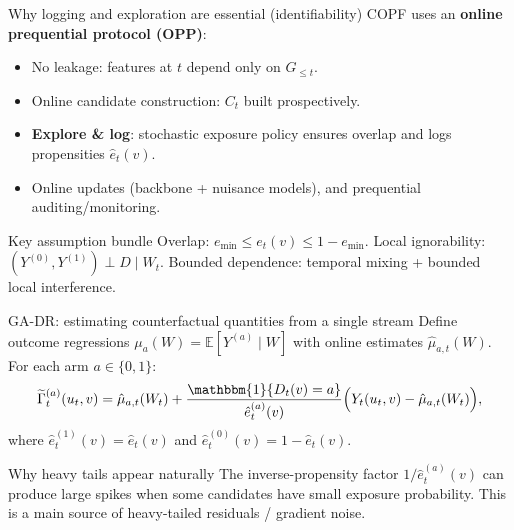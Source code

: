 \documentclass[aspectratio=169,11pt]{beamer}
\newcommand{\1}{\mathbbm{1}}
\newcommand{\E}{\mathbb{E}}
\begin{document}
\begin{frame}{Why logging and exploration are essential (identifiability)}
\small
COPF uses an \textbf{online prequential protocol (OPP)}:
\begin{itemize}
  \item No leakage: features at $t$ depend only on $G_{\le t}$.
  \item Online candidate construction: $C_t$ built prospectively.
  \item \textbf{Explore \& log}: stochastic exposure policy ensures overlap and logs propensities $\hat e_t(v)$.
  \item Online updates (backbone + nuisance models), and prequential auditing/monitoring.
\end{itemize}
\vspace{0.4em}
\begin{block}{Key assumption bundle}
\small
Overlap: $e_{\min}\le e_t(v)\le 1-e_{\min}$.\quad
Local ignorability: $(Y^{(0)},Y^{(1)})\perp D\mid W_t$.\quad
Bounded dependence: temporal mixing + bounded local interference.
\end{block}
\end{frame}

\begin{frame}{GA-DR: estimating counterfactual quantities from a single stream}
\small
Define outcome regressions $\mu_a(W)=\E[Y^{(a)}\mid W]$ with online estimates $\hat\mu_{a,t}(W)$.
For each arm $a\in\{0,1\}$:
\[
\widetilde\Gamma_t^{(a)}(u_t,v)
=\hat\mu_{a,t}(W_t)
+\frac{\1\{D_t(v)=a\}}{\hat e_t^{(a)}(v)}\Big(Y_t(u_t,v)-\hat\mu_{a,t}(W_t)\Big),
\]
where $\hat e_t^{(1)}(v)=\hat e_t(v)$ and $\hat e_t^{(0)}(v)=1-\hat e_t(v)$.

\begin{block}{Why heavy tails appear naturally}
\small The inverse-propensity factor $1/\hat e_t^{(a)}(v)$ can produce large spikes when some candidates have small exposure probability.
This is a main source of heavy-tailed residuals / gradient noise.
\end{block}
\end{frame}
\end{document}
